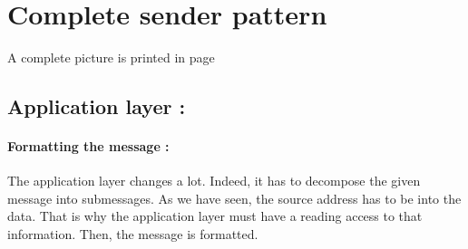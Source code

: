\documentclass[a4paper, onecolumn, 10pt]{article}
\numberwithin{equation}{section}
\begin{document}
% 
% 

\section{Complete sender pattern}
A complete picture is printed in page \pageref{fig:OSImodified}
\subsection{Application layer :}
\paragraph{Formatting the message :}
The application layer changes a lot. Indeed, it has to decompose the given message into submessages. As we have seen, the source address has to be into the data. That is why the application layer must have a reading access to that information. Then, the message is formatted. 
\end{document}
